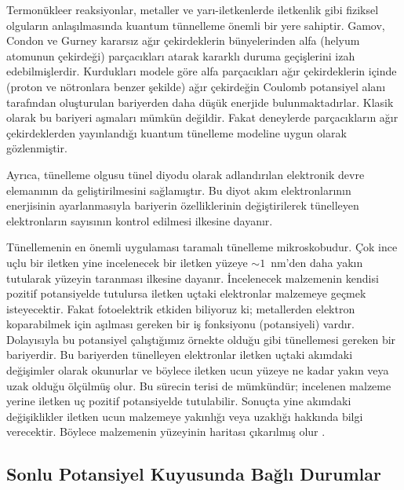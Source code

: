 \documentclass[00_kitap.tex]{subfiles}
\begin{document}
Termonükleer reaksiyonlar, metaller ve yarı-iletkenlerde iletkenlik gibi
fiziksel olguların anlaşılmasında kuantum tünnelleme önemli bir yere sahiptir. 
Gamov, Condon ve Gurney kararsız ağır çekirdeklerin bünyelerinden alfa (helyum atomunun çekirdeği) parçacıkları atarak kararklı duruma geçişlerini izah edebilmişlerdir. Kurdukları modele göre alfa parçacıkları ağır çekirdeklerin içinde (proton ve nötronlara benzer şekilde) 
ağır çekirdeğin Coulomb potansiyel alanı tarafından oluşturulan bariyerden daha düşük enerjide
bulunmaktadırlar. Klasik olarak bu bariyeri aşmaları mümkün değildir. Fakat deneylerde parçacıkların ağır çekirdeklerden yayınlandığı kuantum tünelleme modeline uygun olarak gözlenmiştir. 

Ayrıca, tünelleme olgusu tünel diyodu olarak adlandırılan elektronik devre elemanının da geliştirilmesini sağlamıştır. Bu diyot akım elektronlarının enerjisinin ayarlanmasıyla bariyerin özelliklerinin değiştirilerek tünelleyen elektronların sayısının kontrol edilmesi ilkesine dayanır.

Tünellemenin en önemli uygulaması taramalı tünelleme mikroskobudur. Çok ince uçlu bir iletken yine incelenecek bir iletken yüzeye $\sim1$~nm'den daha yakın tutularak yüzeyin taranması ilkesine dayanır. İncelenecek malzemenin kendisi pozitif potansiyelde tutulursa iletken uçtaki elektronlar malzemeye geçmek isteyecektir. Fakat fotoelektrik etkiden biliyoruz ki; metallerden elektron koparabilmek için aşılması gereken bir iş fonksiyonu (potansiyeli) vardır. Dolayısıyla bu potansiyel çalıştığımız örnekte olduğu gibi tünellemesi gereken bir bariyerdir. Bu bariyerden tünelleyen elektronlar iletken uçtaki akımdaki değişimler olarak okunurlar ve böylece iletken ucun yüzeye ne kadar yakın veya uzak olduğu ölçülmüş olur. Bu sürecin terisi de mümkündür; incelenen malzeme yerine iletken uç pozitif potansiyelde tutulabilir. Sonuçta yine akımdaki değişiklikler iletken ucun malzemeye yakınlığı veya uzaklığı hakkında bilgi verecektir. Böylece malzemenin yüzeyinin haritası çıkarılmış olur \cite{book:Ficek}.


\subsection{Sonlu Potansiyel Kuyusunda Bağlı Durumlar}
\end{document}
